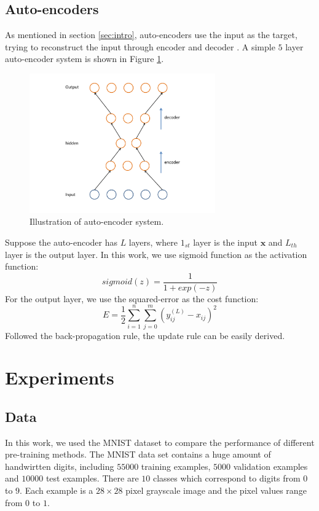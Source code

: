 \documentclass[tikz, multi,dvipsnames,svgnames,x11names]{article}
\begin{document}
\subsection{Auto-encoders}
\label{autoencoder}

As mentioned in section \ref{sec:intro}, auto-encoders use the input as the target, trying to reconstruct the input through encoder and decoder \cite{bengio2012deep}. A simple $5$ layer auto-encoder system is shown in Figure \ref{fig:autoencoder}.
\begin{figure}[htb]
\centering
\includegraphics[width=8cm]{./figures/autoencoder.pdf}
\caption{Illustration of auto-encoder system.}
\label{fig:autoencoder}
\end{figure}

Suppose the auto-encoder has $L$ layers, where $1_{st}$ layer is the input $\bm x$ and $L_{th}$ layer is the output layer. In this work, we use sigmoid function as the activation function:
\begin{equation}
sigmoid(z) = \frac{1}{1 + exp(-z)}
\end{equation}
For the output layer, we use the squared-error as the cost function:
\begin{equation}
E = \frac{1}{2}\sum_{i=1}^n \sum_{j=0}^m (y_{ij}^{(L)} - x_{ij})^2
\end{equation}
Followed the back-propagation rule, the update rule can be easily derived.


\section{Experiments}
\label{sec:experiment}

\subsection{Data}
\label{data}
In this work, we used the MNIST dataset \cite{lecun1998gradient} to compare the performance of different pre-training methods. The MNIST data set contains a huge amount of handwirtten digits, including $55000$ training examples, $5000$ validation examples and $10000$ test examples. There are $10$ classes which correspond to digits from $0$ to $9$. Each example is a $28 \times 28$ pixel grayscale image and the pixel values range from $0$ to $1$.
\end{document}
